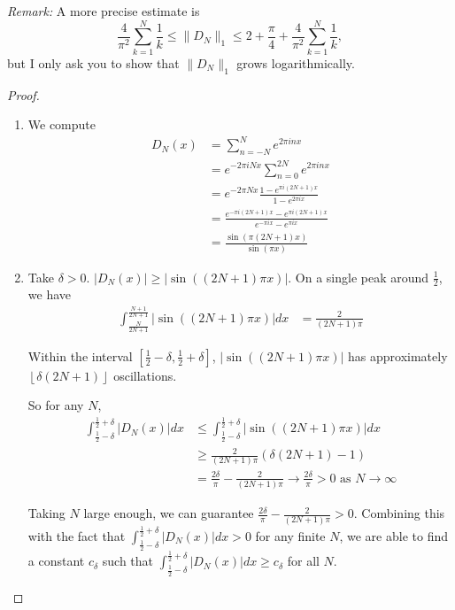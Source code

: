 \documentclass[a4paper]{article}
\begin{document}
\begin{enumerate}
\begin{enumerate}[(a)]
{\it{Remark:}}  A more precise estimate is $$ \frac{4}{\pi^2} \sum_{k=1}^N \frac1{k} \le \| D_N \|_1 \le 2 + \frac{\pi}{4} +   \frac{4}{\pi^2} \sum_{k=1}^N \frac1{k},$$ but I only ask you to show that $\| D_N \|_1$ grows logarithmically.
\end{enumerate}

\begin{proof}
  \begin{enumerate}
    \item
      We compute
      \begin{align*}
        D_N(x) &= \sum_{n=-N}^N e^{2 \pi i n x} \\
        &= e^{-2 \pi i N x} \sum_{n=0}^{2N} e^{2 \pi i n x} \\
        &= e^{-2 \pi N x} \frac{1 - e^{\pi i (2N+1)x}}{1 - e^{2 \pi i x}} \\
        &= \frac{e^{-\pi i (2N+1)x} - e^{\pi i (2N+1) x}}{ e^{-\pi i x} - e^{ \pi i x}} \\
        &= \frac{\sin \left( \pi (2N+1)x \right)}{\sin \left( \pi x \right)}
      \end{align*}

    \item
      Take $\delta > 0$. $|D_N(x)| \geq | \sin\left( (2N+1) \pi x \right) |$. On a single peak around $\frac{1}{2}$, we have
      \begin{align*}
        \int_{\frac{N}{2N+1}}^{\frac{N+1}{2N+1}} |\sin \left( (2N+1) \pi x \right) | dx &= \frac{2}{(2N+1)\pi}
      \end{align*}

      Within the interval $\left[ \frac{1}{2} - \delta, \frac{1}{2} + \delta \right]$, $|\sin\left( (2N+1) \pi x \right)|$ has approximately $\left
      \lfloor{\delta (2N+1)} \right \rfloor$ oscillations.

      So for any $N$,
      \begin{align*}
        \int_{\frac{1}{2}-\delta}^{\frac{1}{2} + \delta} | D_N(x) | dx &\leq \int_{\frac{1}{2} - \delta}^{\frac{1}{2} + \delta} | \sin\left( (2N+1)
        \pi x \right) | dx \\
        &\geq \frac{2}{(2N+1) \pi} (\delta (2N+1) - 1) \\
        &= \frac{2 \delta}{\pi} - \frac{2}{(2N+1)\pi} \to \frac{2 \delta}{\pi} > 0 \text{ as } N \to \infty
      \end{align*}

      Taking $N$ large enough, we can guarantee $\frac{2\delta}{\pi} - \frac{2}{(2N+1) \pi} > 0$. Combining this with the fact that
      $\int_{\frac{1}{2} - \delta}^{\frac{1}{2} + \delta} |D_N(x)| dx > 0$ for any finite $N$, we are able to find a constant $c_\delta$ such that
      $\int_{\frac{1}{2} - \delta}^{\frac{1}{2} + \delta} |D_N(x)|dx \geq c_\delta$ for all $N$.


\end{enumerate}
\end{proof}
\end{enumerate}
\end{document}
